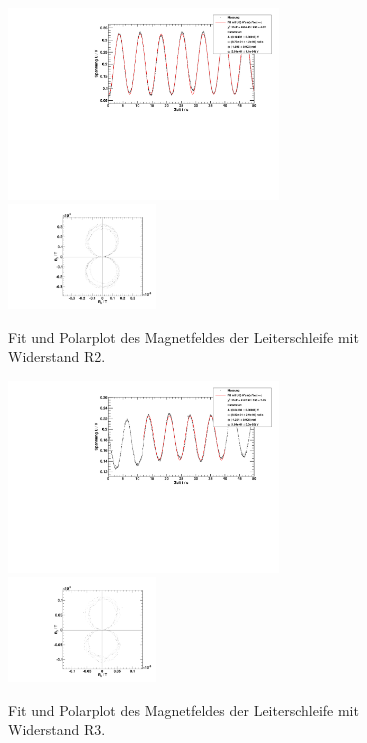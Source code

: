 \begin{figure}[H]
\begin{center}
  \includegraphics[width=0.64\textwidth]{../img/fit_Spule_R2.pdf}
  \includegraphics[width=0.35\textwidth]{../img/polar_Spule_R2.pdf}
  \caption{Fit und Polarplot des Magnetfeldes der Leiterschleife mit Widerstand R2.}
  \label{img:R2}
\end{center}
\end{figure}

\begin{figure}[H]
\begin{center}
  \includegraphics[width=0.64\textwidth]{../img/fit_Spule_R3.pdf}
  \includegraphics[width=0.35\textwidth]{../img/polar_Spule_R3.pdf}
  \caption{Fit und Polarplot des Magnetfeldes der Leiterschleife mit Widerstand R3.}
  \label{img:R3}
\end{center}
\end{figure}


